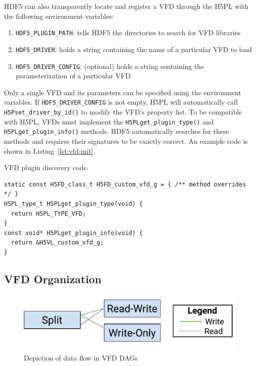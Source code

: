 HDF5 can also transparently locate and register a VFD through the H5PL with the following environment variables:
\begin{enumerate}
    \item \texttt{HDF5\_PLUGIN\_PATH}: tells HDF5 the directories to search for VFD libraries
    \item \texttt{HDF5\_DRIVER}: holds a string containing the name of a particular VFD to load
    \item \texttt{HDF5\_DRIVER\_CONFIG}: (optional) holds a string containing the parameterization of a particular VFD
\end{enumerate}
Only a single VFD and its parameters can be specified using the environment variables. If \texttt{HDF5\_DRIVER\_CONFIG} is not empty, H5PL will automatically call \texttt{H5Pset\_driver\_by\_id()} to modify the VFD's property list. To be compatible with H5PL, VFDs must implement the \texttt{H5PLget\_plugin\_type()} and \texttt{H5PLget\_plugin\_info()} methods. HDF5 automatically searches for these methods and requires their signatures to be exactly correct. An example code is shown in Listing~\ref{lst:vfd-init}.

\begin{listing}[!ht]
\centering
\caption{VFD plugin discovery code.}
\label{lst:vfd-init}
\begin{verbatim}
static const H5FD_class_t H5FD_custom_vfd_g = { /** method overrides */ }
H5PL_type_t H5PLget_plugin_type(void) {
  return H5PL_TYPE_VFD;
}
const void* H5PLget_plugin_info(void) {
  return &H5VL_custom_vfd_g;
}
\end{verbatim}
\end{listing}

\subsection{VFD Organization}

\begin{figure}[!ht]
  \centering
  \includegraphics{images/tour_4_vfd_dags.pdf}
  \caption{Depiction of data flow in VFD DAGs}
  \label{fig:vfd-dag}
\end{figure}

